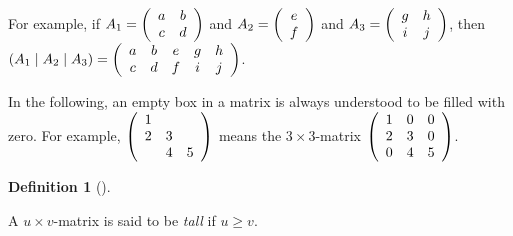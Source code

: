 \documentclass[numbers=enddot,12pt,final,onecolumn,notitlepage]{scrartcl}%
\theoremstyle{definition}
\newtheorem{defi}[theo]{Definition}
\newenvironment{definition}[1][]
{\begin{defi}[#1]\begin{leftbar}}
{\end{leftbar}\end{defi}}
\renewcommand{\geq}{\geqslant}
\theoremstyle{plainsl}
\begin{document}
For example, if $A_{1}=\left(
\begin{array}
[c]{cc}%
a & b\\
c & d
\end{array}
\right)  $ and $A_{2}=\left(
\begin{array}
[c]{c}%
e\\
f
\end{array}
\right)  $ and $A_{3}=\left(
\begin{array}
[c]{cc}%
g & h\\
i & j
\end{array}
\right)  $, then $\left(  A_{1}\mid A_{2}\mid A_{3}\right)  =\left(
\begin{array}
[c]{ccccc}%
a & b & e & g & h\\
c & d & f & i & j
\end{array}
\right)  $.

In the following, an empty box in a matrix is always understood to be filled
with zero. For example, $\left(
\begin{array}
[c]{ccc}%
1 &  & \\
2 & 3 & \\
& 4 & 5
\end{array}
\right)  $ means the $3\times3$-matrix $\left(
\begin{array}
[c]{ccc}%
1 & 0 & 0\\
2 & 3 & 0\\
0 & 4 & 5
\end{array}
\right)  $.

\begin{definition}
A $u\times v$-matrix is said to be \emph{tall} if $u\geq v$.
\end{definition}
\end{document}
